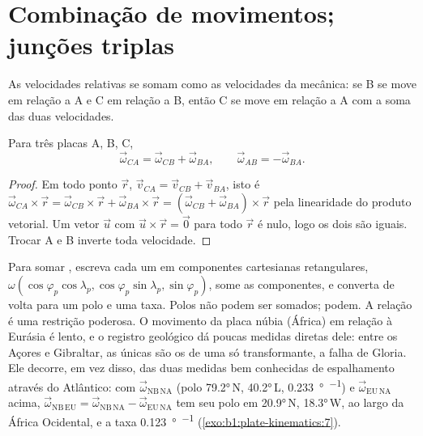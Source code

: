 \section{Combinação de movimentos; junções triplas}

As velocidades relativas se somam como as velocidades da mecânica: se B se move em relação a
A e C em relação a B, então C se move em relação a A com a soma das duas
velocidades.

\begin{proposition}\label{prop:b1:plate-kinematics:addition}
Para três placas A, B, C,
\[
  \vec\omega_{CA} = \vec\omega_{CB} + \vec\omega_{BA}, \qquad
  \vec\omega_{AB} = -\vec\omega_{BA}.
\]
\end{proposition}

\begin{proof}
Em todo ponto $\vec r$, $\vec v_{CA} = \vec v_{CB} + \vec v_{BA}$, isto é
$\vec\omega_{CA}\times\vec r = \vec\omega_{CB}\times\vec r +
\vec\omega_{BA}\times\vec r = (\vec\omega_{CB} + \vec\omega_{BA})\times\vec r$
pela linearidade do produto vetorial. Um vetor $\vec u$ com
$\vec u\times\vec r = \vec 0$ para todo $\vec r$ é nulo, logo os dois 
são iguais. Trocar A e B inverte toda velocidade.
\end{proof}

Para somar , escreva cada um em componentes cartesianas retangulares, $\omega(\cos\varphi_p
\cos\lambda_p, \cos\varphi_p\sin\lambda_p, \sin\varphi_p)$, some as componentes,
e converta de volta para um polo e uma taxa. Polos não podem ser somados; 
podem. A relação é uma restrição poderosa. O movimento da placa núbia
(África) em relação à Eurásia é lento, e o registro geológico dá poucas
medidas diretas dele: entre os Açores e Gibraltar, as únicas são os
 de uma só transformante, a falha de Gloria. Ele decorre, em vez disso, das
duas medidas bem conhecidas de espalhamento através do Atlântico: com $\vec\omega_{\mathrm{NB\,NA}}$ (polo
\ang{79.2}\,N, \ang{40.2}\,L, \qty{0.233}{\degree\per\Myr}) e
$\vec\omega_{\mathrm{EU\,NA}}$ acima, $\vec\omega_{\mathrm{NB\,EU}} =
\vec\omega_{\mathrm{NB\,NA}} - \vec\omega_{\mathrm{EU\,NA}}$ tem seu polo em
\ang{20.9}\,N, \ang{18.3}\,W, ao largo da África Ocidental, e a taxa
\qty{0.123}{\degree\per\Myr} (\cref{exo:b1:plate-kinematics:7}).

